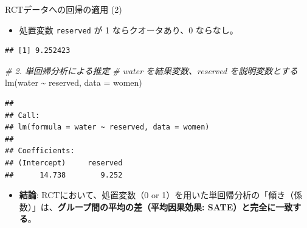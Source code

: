 \documentclass[
  ignorenonframetext,
]{beamer}
\newenvironment{Shaded}{\begin{snugshade}}{\end{snugshade}}
\newcommand{\AttributeTok}[1]{\textcolor[rgb]{0.77,0.63,0.00}{#1}}
\newcommand{\CommentTok}[1]{\textcolor[rgb]{0.56,0.35,0.01}{\textit{#1}}}
\newcommand{\DecValTok}[1]{\textcolor[rgb]{0.00,0.00,0.81}{#1}}
\newcommand{\FunctionTok}[1]{\textcolor[rgb]{0.00,0.00,0.00}{#1}}
\newcommand{\NormalTok}[1]{#1}
\newcommand{\SpecialCharTok}[1]{\textcolor[rgb]{0.00,0.00,0.00}{#1}}
\providecommand{\tightlist}{%
  \setlength{\itemsep}{0pt}\setlength{\parskip}{0pt}}
\begin{document}
\begin{frame}[fragile]{RCTデータへの回帰の適用 (2)}
\protect\hypertarget{rctux30c7ux30fcux30bfux3078ux306eux56deux5e30ux306eux9069ux7528-2}{}
\begin{itemize}
\tightlist
\item
  処置変数 \texttt{reserved} が 1 ならクオータあり、0 ならなし。
\end{itemize}

\scriptsize

\begin{Shaded}
\end{Shaded}

\begin{verbatim}
## [1] 9.252423
\end{verbatim}

\begin{Shaded}
\begin{Highlighting}[]
\CommentTok{\# 2. 単回帰分析による推定}
\CommentTok{\# water を結果変数、reserved を説明変数とする}
\FunctionTok{lm}\NormalTok{(water }\SpecialCharTok{\textasciitilde{}}\NormalTok{ reserved, }\AttributeTok{data =}\NormalTok{ women)}
\end{Highlighting}
\end{Shaded}

\begin{verbatim}
## 
## Call:
## lm(formula = water ~ reserved, data = women)
## 
## Coefficients:
## (Intercept)     reserved  
##      14.738        9.252
\end{verbatim}

\normalsize

\begin{itemize}
\tightlist
\item
  \textbf{結論}: RCTにおいて、処置変数（0 or
  1）を用いた単回帰分析の「傾き（係数）」は、\textbf{グループ間の平均の差（平均因果効果:
  SATE）と完全に一致する}。
\end{itemize}
\end{frame}
\end{document}
